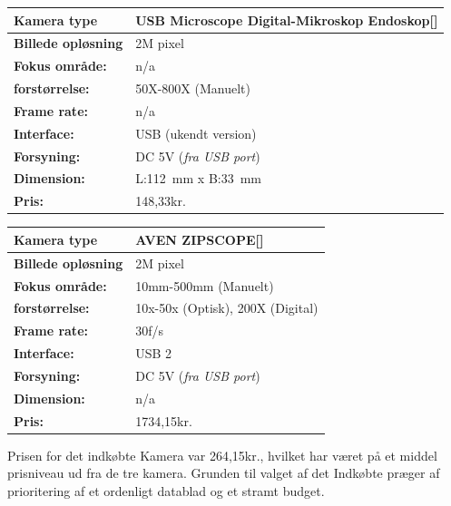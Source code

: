 \begin{center}
		\begin{longtable}{ | m{3cm} | m{9.5cm}| } 
			\hline
			\textbf{Kamera type} & USB Microscope Digital-Mikroskop Endoskop[\citet{DH9}] \\ 		
			\hline
			\textbf{Billede opløsning} & 2M pixel \\ 
			\hline
			\textbf{Fokus område:} & n/a  \\ 
			\hline
			\textbf{forstørrelse:} & 50X-800X (Manuelt)  \\ 
			\hline 
			\textbf{Frame rate:} & n/a  \\ 
			\hline
			\textbf{Interface:} & USB (ukendt version)  \\ 
			\hline
			\textbf{Forsyning:} & DC 5V (\textit{fra USB port})  \\ 
			\hline
			\textbf{Dimension:} & L:\SI{112}{\milli\metre} x B:\SI{33}{\milli\metre}  \\ 
			\hline	
			\textbf{Pris:} & 148,33kr.\\ 
			\hline
		\end{longtable}
	\end{center}
	
	\begin{center}
		\begin{longtable}{ | m{3cm} | m{9.5cm}| } 
			\hline
			\textbf{Kamera type} & AVEN ZIPSCOPE[\citet{DH10}] \\ 		
			\hline
			\textbf{Billede opløsning} & 2M pixel \\ 
			\hline
			\textbf{Fokus område:} &  10mm-500mm (Manuelt) \\ 
			\hline
			\textbf{forstørrelse:} & 10x-50x (Optisk), 200X (Digital)  \\ 
			\hline
			\textbf{Frame rate:} & 30f/s  \\ 
			\hline
			\textbf{Interface:} & USB 2  \\ 
			\hline
			\textbf{Forsyning:} & DC 5V (\textit{fra USB port})  \\ 
			\hline
			\textbf{Dimension:} & n/a \\ 
			\hline	
			\textbf{Pris:} & 1734,15kr.\\ 
			\hline
		\end{longtable}
	\end{center}
	
Prisen for det indkøbte Kamera var 264,15kr., hvilket har været på et middel prisniveau ud fra de tre kamera. Grunden til valget af det Indkøbte præger af prioritering af et ordenligt datablad og et stramt budget.

